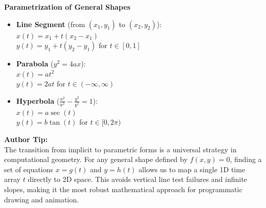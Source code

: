 \documentclass[12pt, a4paper]{report}
\begin{document}
\noindent
\begin{minipage}[t]{0.65\textwidth}
    \vspace{0pt}
    \begin{mdframed}[backgroundcolor=gray!10, linecolor=black, linewidth=1pt, roundcorner=5pt]
        \textbf{Parametrization of General Shapes} \\
        \vspace{0.2cm}
        \small
        \begin{itemize}
            \item \textbf{Line Segment} (from $(x_1, y_1)$ to $(x_2, y_2)$): \\
            $x(t) = x_1 + t(x_2 - x_1)$ \\
            $y(t) = y_1 + t(y_2 - y_1)$ \quad for $t \in [0, 1]$
            
            \vspace{0.1cm}
            \item \textbf{Parabola} ($y^2 = 4ax$): \\
            $x(t) = at^2$ \\
            $y(t) = 2at$ \quad for $t \in (-\infty, \infty)$
            
            \vspace{0.1cm}
            \item \textbf{Hyperbola} ($\frac{x^2}{a^2} - \frac{y^2}{b^2} = 1$): \\
            $x(t) = a \sec(t)$ \\
            $y(t) = b \tan(t)$ \quad for $t \in [0, 2\pi)$
        \end{itemize}
    \end{mdframed}
\end{minipage}
\hfill
\begin{minipage}[t]{0.3\textwidth}
    \vspace{0pt}
    \scriptsize \textbf{Author Tip:}\\
    The transition from implicit to parametric forms is a universal strategy in computational geometry. For any general shape defined by $f(x, y) = 0$, finding a set of equations $x = g(t)$ and $y = h(t)$ allows us to map a single 1D time array $t$ directly to 2D space. This avoids vertical line test failures and infinite slopes, making it the most robust mathematical approach for programmatic drawing and animation.
\end{minipage}
\vspace{0.5cm}
\end{document}
